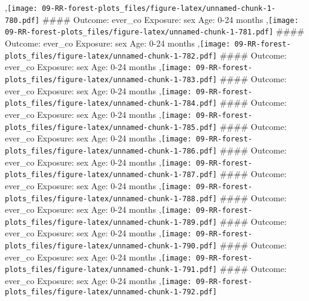 \documentclass[
  9pt,
]{book}
\begin{document}
,\texttt{[image: 09-RR-forest-plots\_files/figure-latex/unnamed-chunk-1-780.pdf]}
\#\#\#\# Outcome: ever\_co Exposure: sex Age: 0-24 months
,\texttt{[image: 09-RR-forest-plots\_files/figure-latex/unnamed-chunk-1-781.pdf]}
\#\#\#\# Outcome: ever\_co Exposure: sex Age: 0-24 months
,\texttt{[image: 09-RR-forest-plots\_files/figure-latex/unnamed-chunk-1-782.pdf]}
\#\#\#\# Outcome: ever\_co Exposure: sex Age: 0-24 months
,\texttt{[image: 09-RR-forest-plots\_files/figure-latex/unnamed-chunk-1-783.pdf]}
\#\#\#\# Outcome: ever\_co Exposure: sex Age: 0-24 months
,\texttt{[image: 09-RR-forest-plots\_files/figure-latex/unnamed-chunk-1-784.pdf]}
\#\#\#\# Outcome: ever\_co Exposure: sex Age: 0-24 months
,\texttt{[image: 09-RR-forest-plots\_files/figure-latex/unnamed-chunk-1-785.pdf]}
\#\#\#\# Outcome: ever\_co Exposure: sex Age: 0-24 months
,\texttt{[image: 09-RR-forest-plots\_files/figure-latex/unnamed-chunk-1-786.pdf]}
\#\#\#\# Outcome: ever\_co Exposure: sex Age: 0-24 months
,\texttt{[image: 09-RR-forest-plots\_files/figure-latex/unnamed-chunk-1-787.pdf]}
\#\#\#\# Outcome: ever\_co Exposure: sex Age: 0-24 months
,\texttt{[image: 09-RR-forest-plots\_files/figure-latex/unnamed-chunk-1-788.pdf]}
\#\#\#\# Outcome: ever\_co Exposure: sex Age: 0-24 months
,\texttt{[image: 09-RR-forest-plots\_files/figure-latex/unnamed-chunk-1-789.pdf]}
\#\#\#\# Outcome: ever\_co Exposure: sex Age: 0-24 months
,\texttt{[image: 09-RR-forest-plots\_files/figure-latex/unnamed-chunk-1-790.pdf]}
\#\#\#\# Outcome: ever\_co Exposure: sex Age: 0-24 months
,\texttt{[image: 09-RR-forest-plots\_files/figure-latex/unnamed-chunk-1-791.pdf]}
\#\#\#\# Outcome: ever\_co Exposure: sex Age: 0-24 months
,\texttt{[image: 09-RR-forest-plots\_files/figure-latex/unnamed-chunk-1-792.pdf]}

  
\end{document}
